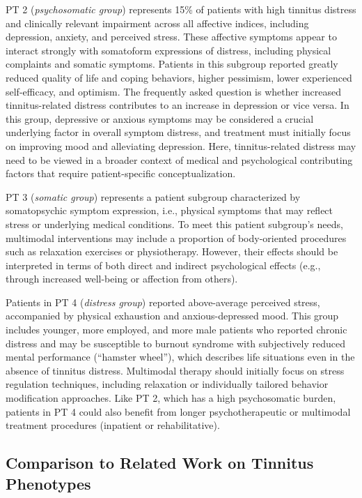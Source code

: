 \documentclass[
  oneside]{book}
\begin{document}
PT 2 (\emph{psychosomatic group}) represents 15\% of patients with high tinnitus distress and clinically relevant impairment across all affective indices, including depression, anxiety, and perceived stress.
These affective symptoms appear to interact strongly with somatoform expressions of distress, including physical complaints and somatic symptoms.
Patients in this subgroup reported greatly reduced quality of life and coping behaviors, higher pessimism, lower experienced self-efficacy, and optimism.
The frequently asked question is whether increased tinnitus-related distress contributes to an increase in depression or vice versa.
In this group, depressive or anxious symptoms may be considered a crucial underlying factor in overall symptom distress, and treatment must initially focus on improving mood and alleviating depression.
Here, tinnitus-related distress may need to be viewed in a broader context of medical and psychological contributing factors that require patient-specific conceptualization.

PT 3 (\emph{somatic group}) represents a patient subgroup
characterized by somatopsychic symptom expression, i.e., physical symptoms that may reflect stress or underlying medical conditions.
To meet this patient subgroup's needs, multimodal interventions may include a proportion of body-oriented procedures such as relaxation exercises or physiotherapy.
However, their effects should be interpreted in terms of both direct and indirect psychological effects (e.g., through increased well-being or affection from others).

Patients in PT 4 (\emph{distress group}) reported above-average perceived stress, accompanied by physical exhaustion and anxious-depressed mood.
This group includes younger, more employed, and more male patients who reported chronic distress and may be susceptible to burnout syndrome with subjectively reduced mental performance (``hamster wheel''), which describes life situations even in the absence of tinnitus distress.
Multimodal therapy should initially focus on stress regulation techniques, including relaxation or individually tailored behavior modification approaches.
Like PT 2, which has a high psychosomatic burden, patients in PT 4 could also benefit from longer psychotherapeutic or multimodal treatment procedures (inpatient or rehabilitative).

\hypertarget{comparison-to-related-work-on-tinnitus-phenotypes}{%
\subsection{Comparison to Related Work on Tinnitus Phenotypes}\label{comparison-to-related-work-on-tinnitus-phenotypes}}
\end{document}
